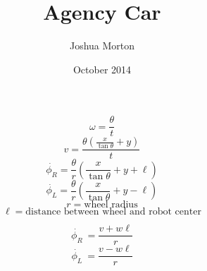 \documentclass{article}
\title{Agency Car}
\author{Joshua Morton }
\date{October 2014}
\begin{document}
\maketitle
\[\omega = \frac{\theta}{t}\]
\[v = \frac{\theta (\frac{x}{\tan\theta}+y)}{t}\]
\[\dot{\phi_R} = \frac{\theta}{r}(\frac{x}{\tan\theta} + y + \ell)\]
\[\dot{\phi_L} = \frac{\theta}{r}(\frac{x}{\tan\theta} + y - \ell)\]
\[r = \mbox{wheel radius}\]
\[\ell = \mbox{distance between wheel and robot center}\]

\[\dot{\phi_R}\ = \frac{v + w\ell}{r}\]
\[\dot{\phi_L}\ = \frac{v - w\ell}{r}\]
\end{document}
